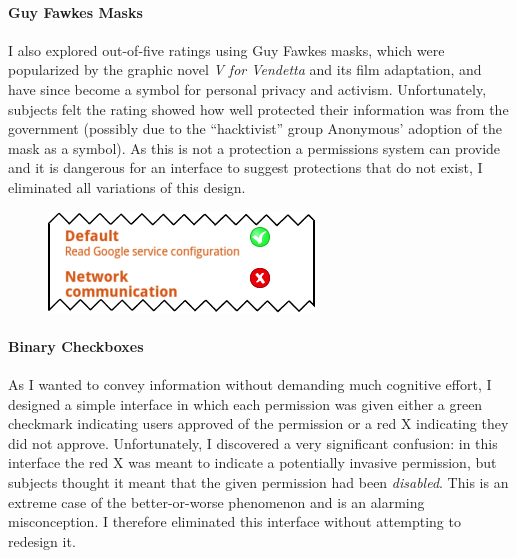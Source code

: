 \documentclass[11pt]{article}
\begin{document}
\paragraph{Guy Fawkes Masks}
\label{s-sec-masks}

I also explored out-of-five ratings using Guy Fawkes masks, which 
were popularized by the graphic novel \emph{V for Vendetta} and its
film adaptation, and have since become a symbol for personal
privacy and activism.
\label{ss-sec-masks-r1}
Unfortunately, subjects felt the
rating showed how well protected their information was from the government 
(possibly due to the ``hacktivist'' group Anonymous' adoption of the mask as a symbol). 
As this is not a protection a permissions system can provide and it is dangerous for an
interface to suggest protections that do not exist, I eliminated all
variations of this design.


\begin{figure}
\begin{center}
\includegraphics[width=.9\linewidth]{candidate-img/checkboxes/checkboxesR1.png}
\end{center}
\end{figure}

\paragraph{Binary Checkboxes}
\label{s-sec-checkbox}

As I wanted to convey information without demanding much cognitive effort,
I designed a simple interface in which 
each permission was given either a green 
checkmark indicating users approved of the permission or a red X indicating 
they did not approve.
\label{ss-sec-binary-r1}
Unfortunately, I discovered a very significant confusion: in this interface
the red X was meant to indicate a potentially invasive permission, but 
subjects thought it meant that the given permission had been \emph{disabled}. This
is an extreme case of the better-or-worse phenomenon and is an 
alarming misconception. I therefore eliminated this interface without attempting to 
redesign it.
\end{document}
